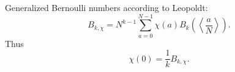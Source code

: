 Generalized Bernoulli numbers according to Leopoldt:
$$B_{k,\chi} = N^{k-1} \sum_{a=0}^{N-1} \chi(a) B_k\left(\left\langle \frac{a}{N} \right\rangle\right).$$
Thus
$$\chi(0) = \frac{1}{k} B_{k,\chi}.$$
